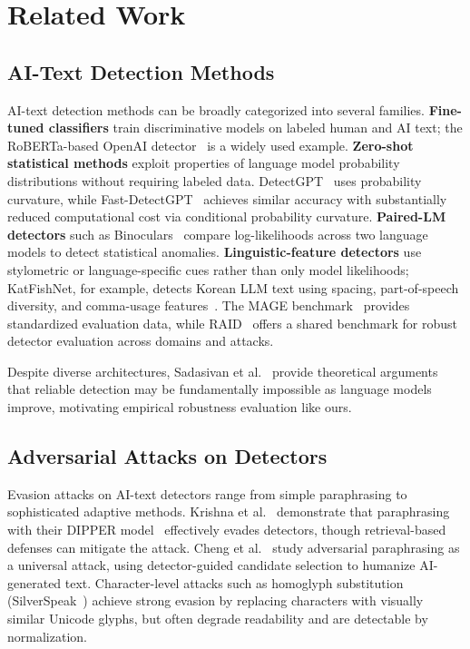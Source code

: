 \documentclass[11pt]{article}
\begin{document}
\section{Related Work}
\label{sec:related}

\subsection{AI-Text Detection Methods}

AI-text detection methods can be broadly categorized into several families. \textbf{Fine-tuned classifiers} train discriminative models on labeled human and AI text; the RoBERTa-based OpenAI detector~\cite{solaiman2019release} is a widely used example. \textbf{Zero-shot statistical methods} exploit properties of language model probability distributions without requiring labeled data. DetectGPT~\cite{mitchell2023detectgptzeroshotmachinegeneratedtext} uses probability curvature, while Fast-DetectGPT~\cite{bao2024fastdetectgptefficientzeroshotdetection} achieves similar accuracy with substantially reduced computational cost via conditional probability curvature. \textbf{Paired-LM detectors} such as Binoculars~\cite{hans2024spottingllmsbinocularszeroshot} compare log-likelihoods across two language models to detect statistical anomalies. \textbf{Linguistic-feature detectors} use stylometric or language-specific cues rather than only model likelihoods; KatFishNet, for example, detects Korean LLM text using spacing, part-of-speech diversity, and comma-usage features~\cite{park-etal-2025-katfishnet}. The MAGE benchmark~\cite{li2024magemachinegeneratedtextdetection} provides standardized evaluation data, while RAID~\cite{dugan2024raidsharedbenchmarkrobust} offers a shared benchmark for robust detector evaluation across domains and attacks.

Despite diverse architectures, Sadasivan et al.~\cite{sadasivan2023aigenerated} provide theoretical arguments that reliable detection may be fundamentally impossible as language models improve, motivating empirical robustness evaluation like ours.

\subsection{Adversarial Attacks on Detectors}

Evasion attacks on AI-text detectors range from simple paraphrasing to sophisticated adaptive methods. Krishna et al.~\cite{krishna2023paraphrasing} demonstrate that paraphrasing with their DIPPER model~\cite{krishna2023dipper} effectively evades detectors, though retrieval-based defenses can mitigate the attack. Cheng et al.~\cite{cheng2025adversarialparaphrasinguniversalattack} study adversarial paraphrasing as a universal attack, using detector-guided candidate selection to humanize AI-generated text. Character-level attacks such as homoglyph substitution (SilverSpeak~\cite{creo2025silverspeakevadingaigeneratedtext}) achieve strong evasion by replacing characters with visually similar Unicode glyphs, but often degrade readability and are detectable by normalization.
\end{document}
